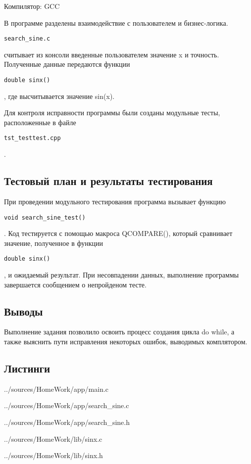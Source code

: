 \documentclass[12pt,a4paper]{report}
\begin{document}
Компилятор: GCC

В программе разделены взаимодействие с пользователем и бизнес-логика. \begin{verbatim}search_sine.c \end{verbatim} считывает из консоли введенные пользователем значение x и точность. Полученные данные передаются функции \begin{verbatim}double sinx() \end{verbatim}, где высчитывается значение sin(x).

Для контроля исправности программы были созданы модульные тесты, расположенные в файле \begin{verbatim}tst_testtest.cpp \end{verbatim}.


\subsection{Тестовый план и результаты тестирования}
При проведении модульного тестирования программа вызывает функцию \begin{verbatim}void search_sine_test() \end{verbatim}. Код тестируется с помощью макроса QCOMPARE(), который сравнивает значение, полученное в функции \begin{verbatim}double sinx() \end{verbatim}, и ожидаемый результат. При несовпадении данных, выполнение программы завершается сообщением о непройденом тесте.

\subsection{Выводы}
Выполнение задания позволило освоить процесс создания цикла do while, а также выяснить пути исправления некоторых ошибок, выводимых комплятором.

\subsection*{Листинги}

{../sources/HomeWork/app/main.c}


{../sources/HomeWork/app/search_sine.c}


{../sources/HomeWork/app/search_sine.h}


{../sources/HomeWork/lib/sinx.c}


{../sources/HomeWork/lib/sinx.h}
\end{document}
